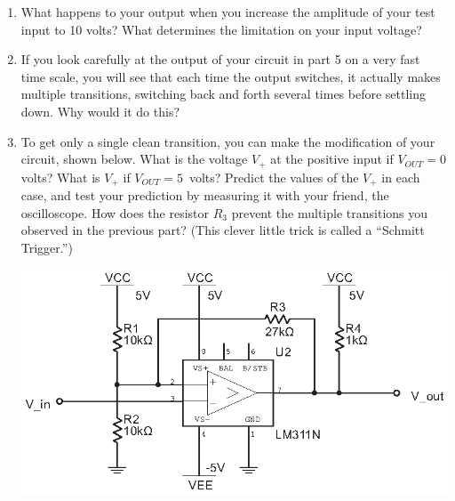 \begin{enumerate}[wide]
\pagebreak[2]

\item What happens to your output when you increase the amplitude of your test input to 10 volts?  What determines the limitation on your input voltage?

\item If you look carefully at the output of your circuit in part 5 on a very fast time scale, you will see that each time the output switches, it actually makes multiple transitions, switching back and forth several times before settling down.  Why would it do this?  

\item To get only a single clean transition, you can make the modification of your circuit, shown below.  What is the voltage $V_+$ at the positive input if $V_{OUT}=0$ volts?  What is $V_+$ if $V_{OUT}=5$~volts?   Predict the values of the $V_+$ in each case, and test your prediction by measuring it with your friend, the oscilloscope.  How does the resistor $R_3$ prevent the multiple transitions you observed in the previous part?  (This clever little trick is called a ``Schmitt Trigger.'')

\begin{center}
\includegraphics{digital_electronics/schmitt_trigger.eps}
\end{center}


\end{enumerate}


